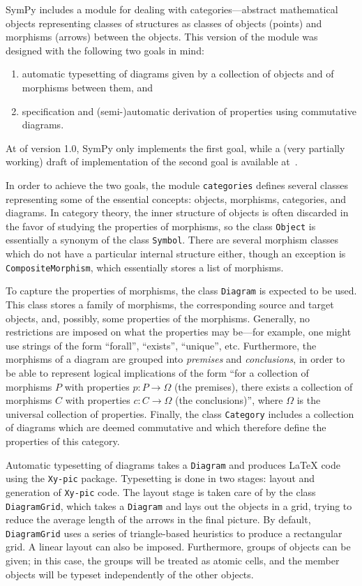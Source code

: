 SymPy includes a module for dealing with categories---abstract mathematical
objects representing classes of structures as classes of objects (points) and
morphisms (arrows) between the objects. This version of the module was
designed with the following two goals in mind:

\begin{enumerate}
\item automatic typesetting of diagrams given by a collection of
  objects and of morphisms between them, and
\item specification and (semi-)automatic derivation of properties
  using commutative diagrams.
\end{enumerate}

At of version 1.0, SymPy only implements the first goal, while a (very partially
working) draft of implementation of the second goal is available
at~\cite{ct4commutativity}.

In order to achieve the two goals, the module \texttt{categories} defines
several classes representing some of the essential concepts: objects, morphisms,
categories, and diagrams.  In category theory, the inner structure of objects is
often discarded in the favor of studying the properties of morphisms, so the
class \texttt{Object} is essentially a synonym of the class \texttt{Symbol}.
There are several morphism classes which do not have a particular internal
structure either, though an exception is \texttt{CompositeMorphism}, which
essentially stores a list of morphisms.

To capture the properties of morphisms, the class \texttt{Diagram} is expected
to be used.  This class stores a family of morphisms, the corresponding source
and target objects, and, possibly, some properties of the morphisms.  Generally,
no restrictions are imposed on what the properties may be---for example, one
might use strings of the form ``forall'', ``exists'', ``unique'', etc.
Furthermore, the morphisms of a diagram are grouped into \textit{premises} and
\textit{conclusions}, in order to be able to represent logical implications of
the form ``for a collection of morphisms $P$ with properties $p:P\to \Omega$ (the
premises), there exists a collection of morphisms $C$ with properties $c:C\to
\Omega$ (the conclusions)'', where $\Omega$ is the universal collection of
properties.  Finally, the class \texttt{Category} includes a collection of
diagrams which are deemed commutative and which therefore define the properties
of this category.

Automatic typesetting of diagrams takes a \texttt{Diagram} and produces \LaTeX{}
code using the \texttt{Xy-pic} package.  Typesetting is done in two stages:
layout and generation of \texttt{Xy-pic} code.  The layout stage is taken care
of by the class \texttt{DiagramGrid}, which takes a \texttt{Diagram} and lays out
the objects in a grid, trying to reduce the average length of the arrows in the
final picture.  By default, \texttt{DiagramGrid} uses a series of triangle-based
heuristics to produce a rectangular grid.  A linear layout can also be imposed.
Furthermore, groups of objects can be given; in this case, the groups will be
treated as atomic cells, and the member objects will be typeset independently of
the other objects.


